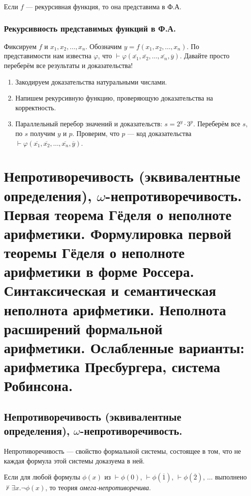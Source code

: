\documentclass[10pt,a4paper,oneside]{article}
\begin{document}
 Если $f$ --- рекурсивная функция, то она представима
в Ф.А.


\subsubsection{Рекурсивность представимых функций в Ф.А.}
Фиксируем $f$ и $x_1, x_2, \dots, x_n$. Обозначим $y = f(x_1,x_2,\dots,x_n)$.
По представимости нам известна $\varphi$, что $\vdash \varphi(\overline{x_1},\overline{x_2},\dots,\overline{x_n},\overline{y})$.
Давайте просто переберём все результаты и доказательства!

\begin{enumerate}
\item Закодируем доказательства натуральными числами.
\item Напишем рекурсивную функцию, проверяющую доказательства на корректность.
\item Параллельный перебор значений и доказательств: $s = 2^y \cdot 3^p$. Переберём все $s$, по $s$ получим $y$ и $p$.
Проверим, что $p$ --- код доказательства $\vdash \varphi(\overline{x_1},\overline{x_2},\dots,\overline{x_n},\overline{y})$.
\end{enumerate}

\section{Непротиворечивость (эквивалентные определения), $\omega$-не\-про\-ти\-во\-ре\-чи\-вость. 
Первая теорема Гёделя о неполноте арифметики.
Формулировка первой теоремы Гёделя о неполноте арифметики в форме Россера. 
Синтаксическая и семантическая неполнота арифметики.
Неполнота расширений формальной арифметики.
Ослабленные варианты: арифметика Пресбургера, система Робинсона.}

\subsection{Непротиворечивость (эквивалентные определения), $\omega$-не\-про\-ти\-во\-ре\-чи\-вость.}
 Непротиворечивость — свойство формальной системы, состоящее в том, что не каждая формула этой системы доказуема в ней. 

 Если для любой формулы $\phi(x)$ из $\vdash\phi(0)$, $\vdash\phi(\overline{1})$,
$\vdash\phi(\overline{2})$, $\dots$ выполнено $\not\vdash\exists x.\neg\phi(x)$, 
то теория \emph{омега-непротиворечива}.
\end{document}
